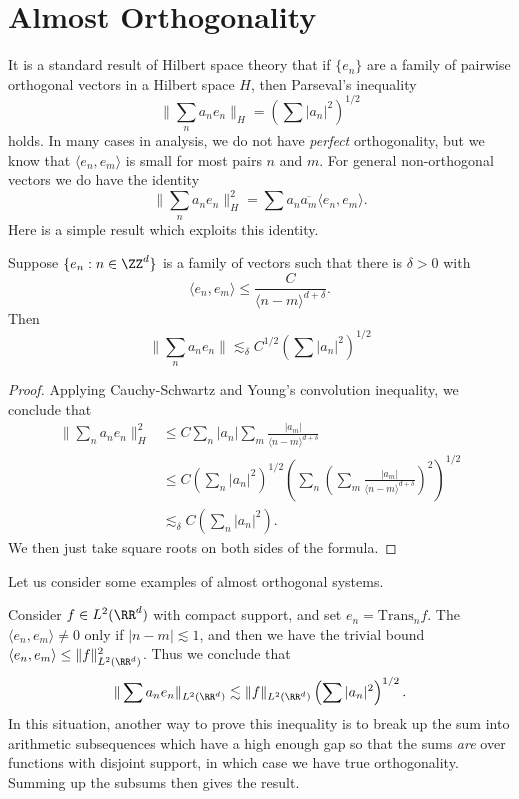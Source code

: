 \chapter{Almost Orthogonality}

It is a standard result of Hilbert space theory that if $\{ e_n \}$ are a family of pairwise orthogonal vectors in a Hilbert space $H$, then Parseval's inequality
%
\[ \| \sum_n a_n e_n \|_H = \left( \sum |a_n|^2 \right)^{1/2} \]
%
holds. In many cases in analysis, we do not have \emph{perfect} orthogonality, but we know that $\langle e_n, e_m \rangle$ is small for most pairs $n$ and $m$. For general non-orthogonal vectors we do have the identity
%
\[ \| \sum_n a_n e_n \|_H^2 = \sum a_n \overline{a_m} \langle e_n, e_m \rangle. \]
%
Here is a simple result which exploits this identity.

\begin{lemma}
  Suppose $\{ e_n : n \in \ZZ^d \}$ is a family of vectors such that there is $\delta > 0$ with
  \[ \langle e_n, e_m \rangle \leq \frac{C}{\langle n - m \rangle^{d + \delta}}. \]
  Then
  \[ \| \sum_n a_n e_n \| \lesssim_\delta C^{1/2} \left( \sum |a_n|^2 \right)^{1/2} \]
\end{lemma}
\begin{proof}
  Applying Cauchy-Schwartz and Young's convolution inequality, we conclude that
  \begin{align*}
    \| \sum_n a_n e_n \|_H^2 &\leq C \sum_n |a_n| \sum_m \frac{|a_m|}{\langle n - m \rangle^{d + \delta}}\\
    &\leq C \left( \sum_n |a_n|^2 \right)^{1/2} \left( \sum_n \left( \sum_m \frac{|a_m|}{\langle n - m \rangle^{d + \delta}} \right)^2 \right)^{1/2}\\
    &\lesssim_\delta C \left( \sum_n |a_n|^2 \right).
  \end{align*}
  We then just take square roots on both sides of the formula.
\end{proof}

Let us consider some examples of almost orthogonal systems.

\begin{example}
  Consider $f \in L^2(\RR^d)$ with compact support, and set $e_n = \text{Trans}_n f$. The $\langle e_n, e_m \rangle \neq 0$ only if $|n - m| \lesssim 1$, and then we have the trivial bound $\langle e_n, e_m \rangle \leq \| f \|_{L^2(\RR^d)}^2$. Thus we conclude that
  \[ \| \sum a_n e_n \|_{L^2(\RR^d)} \lesssim \| f \|_{L^2(\RR^d)} \left( \sum |a_n|^2 \right)^{1/2}. \]
  In this situation, another way to prove this inequality is to break up the sum into arithmetic subsequences which have a high enough gap so that the sums \emph{are} over functions with disjoint support, in which case we have true orthogonality. Summing up the subsums then gives the result.
\end{example}

